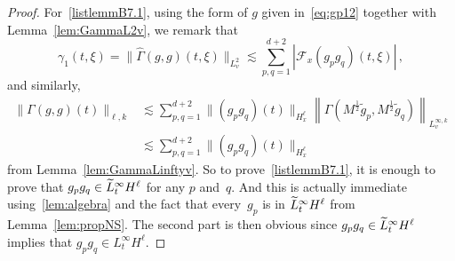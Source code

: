 \documentclass[11pt]{article}
\theoremstyle{definition}
\numberwithin{equation}{section}
\numberwithin{figure}{section}
\numberwithin{table}{section}
\let\oldtilde\tilde
\renewcommand*{\tilde}[1]{\mathchoice{\widetilde{#1}}{\widetilde{#1}}{\oldtilde{#1}}{\oldtilde{#1}}}
\begin{document}
\begin{proof}
For~\eqref{listlemmB7.1}, using the form of $g$ given in~\eqref{eq:gp12} together with Lemma~\ref{lem:GammaL2v}, we remark that
\begin{equation}\label{lem:hatGamma(i)}
\gamma_1(t,\xi) = \big\| \widehat {\Gamma}(g,g)({t},\xi)\big\|_{L^2_v} \lesssim \sum_{p,q=1}^{d+2} |\mathcal{F}_x({g_{p }g_{q }})(t,\xi)| \,,
\end{equation}
and similarly,
\begin{equation}\label{lem:hatGamma(i)bis}
\begin{aligned}
\|\Gamma(g,g)(t)\|_{\ell,k} &\lesssim \sum_{p,q=1}^{d+2} \|(g_pg_q)(t)\|_{H^\ell_x} \left\|\Gamma\left(M^{\frac12} \widetilde g_p, M^{\frac12} \widetilde g_q\right)\right\|_{L^{\infty,k}_v} \\
&\lesssim \sum_{p,q=1}^{d+2} \|(g_pg_q)(t)\|_{H^\ell_x}
\end{aligned}
\end{equation}
from Lemma~\ref{lem:GammaLinftyv}. So to prove~\eqref{listlemmB7.1}, it is enough to prove that $g_pg_q \in \tilde L^\infty_tH^\ell $ for any $p$ and~$q$. And this is actually immediate using~\eqref{lem:algebra} and the fact that every~$g_{p} $ is in $\tilde L^\infty_tH^\ell$ from Lemma~\ref{lem:propNS}. {The second part is then obvious since $g_pg_q \in \tilde L^\infty_tH^\ell $ implies that $g_pg_q \in L^\infty_tH^\ell$.}



\end{proof}
\end{document}
